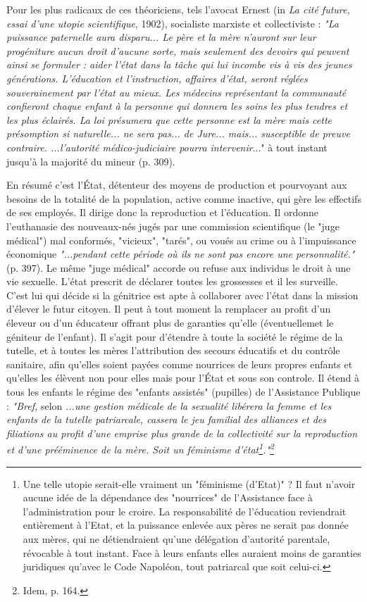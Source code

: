  Pour les plus radicaux de ces théoriciens, tels l'avocat Ernest  (in \emph{La cité future, essai d'une utopie scientifique}, 1902), socialiste marxiste et collectiviste : \emph{"La puissance paternelle aura disparu... Le père et la mère n'auront sur leur progéniture aucun droit d'aucune sorte, mais seulement des devoirs qui peuvent ainsi se formuler : aider l'état dans la tâche qui lui incombe vis à vis des jeunes générations. L'éducation et l'instruction, affaires d'état, seront réglées souverainement par l'état au mieux. Les médecins représentant la communauté confieront chaque enfant à la personne qui donnera les soins les plus tendres et les plus éclairés. La loi présumera que cette personne est la mère mais cette présomption si naturelle... ne sera pas... de Jure... mais... susceptible de preuve contraire.
 ...l'autorité médico-judiciaire pourra intervenir}..." à tout instant jusqu'à la majorité du mineur (p. 309). 
 
 En résumé  c'est l'État, détenteur des moyens de production et pourvoyant aux besoins de la totalité de la population, active comme inactive, qui gère les effectifs de ses employés. Il dirige donc la reproduction et l'éducation. Il ordonne l'euthanasie des nouveaux-nés jugés par une commission scientifique (le "juge médical") mal conformés, "vicieux", "tarés", ou voués au crime ou à l'impuissance économique \emph{"...pendant cette période où ils ne sont pas encore une personnalité."} (p. 397). Le même "juge médical" accorde ou refuse aux individus le droit à une vie sexuelle. L'état prescrit de déclarer toutes les grossesses et il les surveille. C'est lui qui décide si la génitrice est apte à collaborer avec l'état dans la mission d'élever le futur citoyen. Il peut à tout moment la remplacer au profit d'un éleveur ou d'un éducateur offrant plus de garanties qu'elle (éventuellemet le géniteur de l'enfant). Il s'agit pour  d'étendre à toute la société le régime de la tutelle, et à toutes les mères l'attribution des secours éducatifs et du contrôle sanitaire, afin qu'elles soient payées comme nourrices de leurs propres enfants et qu'elles les élèvent non pour elles mais pour l'État et sous son controle. Il étend à tous les enfants le régime des "enfants assistés" (pupilles)  de l'Assistance Publique : \emph{"Bref,} selon   \emph{...une gestion médicale de la sexualité libérera la femme et les enfants de la tutelle patriarcale, cassera le jeu familial des alliances et des filiations au profit d'une emprise plus grande de la collectivité sur la reproduction et d'une prééminence de la mère. Soit un féminisme d'état\footnote{Une telle utopie serait-elle vraiment un "féminisme (d'Etat)" ? Il faut n'avoir aucune idée de la dépendance des "nourrices" de l'Assistance face à l'administration pour le croire. La responsabilité de l'éducation reviendrait entièrement à l'Etat, et la puissance enlevée aux pères ne serait pas donnée aux mères, qui ne détiendraient qu'une délégation d'autorité parentale, révocable à tout instant. Face à leurs enfants elles auraient moins de garanties juridiques qu'avec le Code Napoléon, tout patriarcal que soit celui-ci.}."\footnote{Idem, p. 164.}}
 



